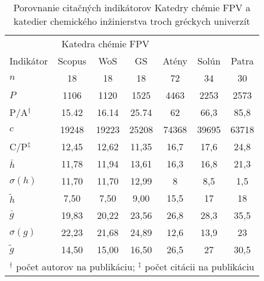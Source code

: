 \begin{SCtable}
  \label{tab:kazakis.results}
\centering\small
  \caption[Porovnanie KCh FPV a kat. chem. inžinierstva  troch gréckych univerzít]
  {Porovnanie citačných indikátorov Katedry chémie FPV a katedier chemického inžinierstva troch gréckych univerzít \citep{Kazakis2015}}
\begin{tabular}{lcccccc}
\toprule\noalign{\vspace{.3ex}}
           & \multicolumn{3}{c}{Katedra chémie FPV} & \multicolumn{3}{c}{\citet{Kazakis2015}}  \\
 Indikátor & Scopus & WoS   & GS    &  Atény     & Solún      & Patra      \\[0.3ex]
\midrule\noalign{\vspace{.5ex}}
 $n$         & 18     & 18    & 18    & 72    & 34    & 30    \\
 $P$         & 1106   & 1120  & 1525  & 4463  & 2253  & 2573  \\
 P/A$^\dagger$         & 15.42  & 16.14 & 25.74 & 62    & 66,3  & 85,8  \\
 $c$         & 19248  & 19223 & 25208 & 74368 & 39695 & 63718 \\
 C/P$^\ddagger$         & 12,45  & 12,62 & 11,35 & 16,7  & 17,6  & 24,8  \\[1ex]
 $\bar{h}$   & 11,78  & 11,94 & 13,61 & 16,3  & 16,8  & 21,3  \\
 $\sigma (h)$ & 11,70  & 11,70 & 12,99 & 8     & 8,5   & 1,5   \\
 $\tilde{h}$ & 7,50   & 7,50  & 9,00  & 15,5  & 17    & 18    \\
 $\bar{g}$   & 19,83  & 20,22 & 23,56 & 26,8  & 28,3  & 35,5  \\
 $\sigma (g)$  & 22,23  & 21,68 & 24,89 & 12,6  & 13,9  & 23    \\
 $\tilde{g}$  & 14,50  & 15,00 & 16,50 & 26,5  & 27    & 30,5  \\[0.5ex]
\bottomrule
  \multicolumn{7}{l}{\footnotesize $^\dagger$ počet autorov na publikáciu; $^\ddagger$ počet citácii na publikáciu} \\
\end{tabular}
\end{SCtable}

